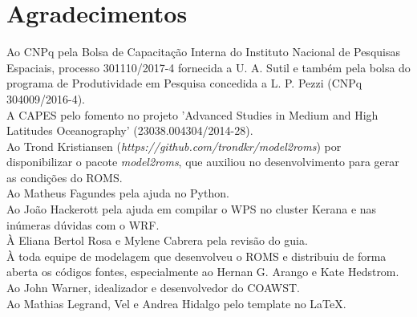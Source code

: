 \chapter*{Agradecimentos}




\noindent Ao CNPq pela Bolsa de Capacitação Interna do Instituto Nacional de Pesquisas Espaciais, processo 301110/2017-4 fornecida a U. A. Sutil e também pela bolsa do programa de Produtividade em Pesquisa concedida a L. P. Pezzi (CNPq 304009/2016-4). \\

\noindent A CAPES pelo fomento no projeto 'Advanced Studies in Medium and High Latitudes Oceanography' (23038.004304/2014-28). \\

\noindent Ao Trond Kristiansen (\textcolor{bleu_cite}{\textit{https://github.com/trondkr/model2roms}}) por disponibilizar o pacote \textit{model2roms}, que auxiliou no desenvolvimento para gerar as condições do ROMS. \\

\noindent Ao Matheus Fagundes pela ajuda no Python. \\

\noindent Ao João Hackerott pela ajuda em compilar o WPS no cluster Kerana e nas inúmeras dúvidas com o WRF. \\

\noindent À Eliana Bertol Rosa e Mylene Cabrera pela revisão do guia. \\

\noindent À toda equipe de modelagem que desenvolveu o ROMS e distribuiu de forma aberta os códigos fontes, especialmente ao Hernan G. Arango e Kate Hedstrom.\\

\noindent Ao John Warner, idealizador e desenvolvedor do COAWST. \\

\noindent Ao Mathias Legrand, Vel e Andrea Hidalgo pelo template no \LaTeX.
